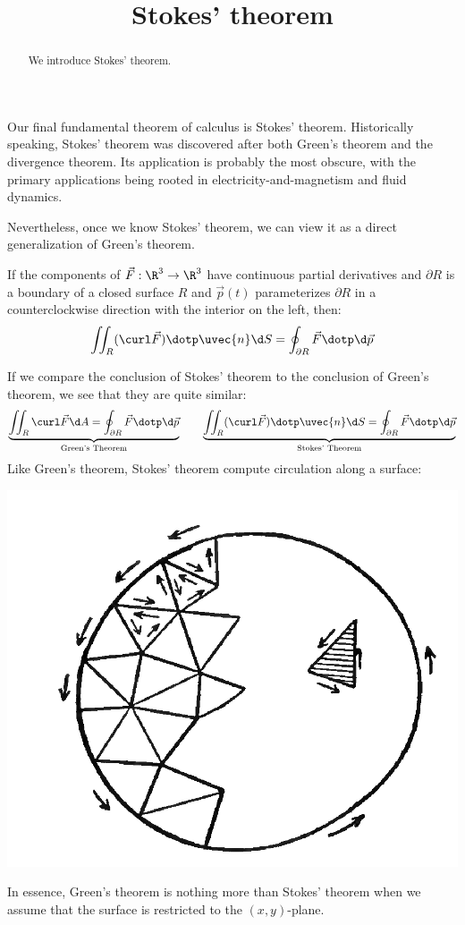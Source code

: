 \documentclass{ximera}
\title[Dig-In:]{Stokes' theorem}
\begin{document}
\begin{abstract}
  We introduce Stokes' theorem.
\end{abstract}
\maketitle

Our final fundamental theorem of calculus is Stokes'
theorem. Historically speaking, Stokes' theorem was discovered after
both Green's theorem and the divergence theorem. Its application is
probably the most obscure, with the primary applications being rooted
in electricity-and-magnetism and fluid dynamics.

Nevertheless, once we know Stokes' theorem, we can view it as a direct
generalization of Green's theorem.

\begin{theorem}
  If the components of $\vec{F}:\R^3\to\R^3$ have continuous partial
  derivatives and $\partial R$ is a boundary of a closed surface $R$
  and $\vec{p}(t)$ parameterizes $\partial R$ in a counterclockwise
  direction with the interior on the left, then:
  \[
  \iint_R (\curl \vec{F})\dotp \uvec{n}\d S = \oint_{\partial R}
  \vec{F}\dotp\d\vec{p}
  \]
\end{theorem}

If we compare the conclusion of Stokes' theorem to the conclusion of
Green's theorem, we see that they are quite similar:
  \[
  \underbrace{\iint_R \curl\vec{F}\d A = \oint_{\partial R} \vec{F}\dotp\d\vec{p}}_{\text{Green's Theorem}}\qquad \underbrace{\iint_R (\curl \vec{F})\dotp \uvec{n}\d S = \oint_{\partial R}
  \vec{F}\dotp\d\vec{p}}_{\text{Stokes' Theorem}}
  \]
  Like Green's theorem, Stokes' theorem compute circulation along a surface:
  \begin{image}
    \includegraphics{circulation.png}
  \end{image}
  In essence, Green's theorem is nothing more than Stokes' theorem
  when we assume that the surface is restricted to the $(x,y)$-plane.
\end{document}
